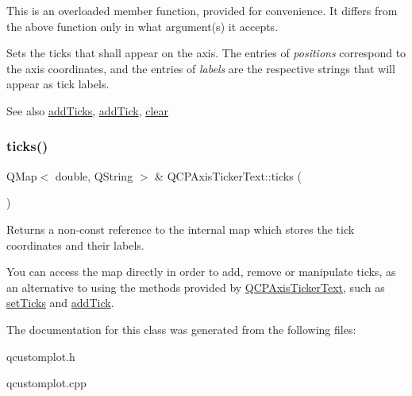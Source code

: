 This is an overloaded member function, provided for convenience. It differs from the above function only in what argument(s) it accepts.

Sets the ticks that shall appear on the axis. The entries of {\itshape positions} correspond to the axis coordinates, and the entries of {\itshape labels} are the respective strings that will appear as tick labels.

\begin{DoxySeeAlso}{See also}
\hyperlink{classQCPAxisTickerText_aba34051300eecaefbedb2df8feff2d45}{add\+Ticks}, \hyperlink{classQCPAxisTickerText_a3362873a48614e6d446c193548cb85e3}{add\+Tick}, \hyperlink{classQCPAxisTickerText_a21826d2fcd9a25c194d34d4f67aa1460}{clear} 
\end{DoxySeeAlso}
\mbox{\label{classQCPAxisTickerText_ac84622a6bb4f2a98474e185ecaf3189a}} 
\subsubsection{\texorpdfstring{ticks()}{ticks()}}
{\footnotesize\ttfamily Q\+Map$<$ double, Q\+String $>$ \& Q\+C\+P\+Axis\+Ticker\+Text\+::ticks (\begin{DoxyParamCaption}{ }\end{DoxyParamCaption})\hspace{0.3cm}{\ttfamily [inline]}}

Returns a non-\/const reference to the internal map which stores the tick coordinates and their labels.

You can access the map directly in order to add, remove or manipulate ticks, as an alternative to using the methods provided by \hyperlink{classQCPAxisTickerText}{Q\+C\+P\+Axis\+Ticker\+Text}, such as \hyperlink{classQCPAxisTickerText_a8cdf1f21940f1f53f5e3d30b2c74f5cf}{set\+Ticks} and \hyperlink{classQCPAxisTickerText_a3362873a48614e6d446c193548cb85e3}{add\+Tick}. 

The documentation for this class was generated from the following files\+:\begin{DoxyCompactItemize}
\item 
qcustomplot.\+h\item 
qcustomplot.\+cpp\end{DoxyCompactItemize}
